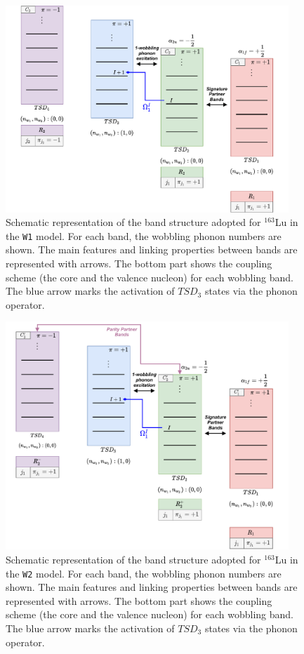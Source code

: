 \documentclass[myclassdoc,debug]{rjparticle}
\begin{document}
\begin{figure}
    \centering
    \includegraphics[width=0.95\textwidth]{figs/W1_Approach.pdf}
    \caption{Schematic representation of the band structure adopted for $^{163}$Lu in the \texttt{W1} model. For each band, the wobbling phonon numbers are shown. The main features and linking properties between bands are represented with arrows. The bottom part shows the coupling scheme (the core and the valence nucleon) for each wobbling band. The blue arrow marks the activation of $TSD_3$ states via the phonon operator.}
    \label{w1-model-worfklow}
\end{figure}
\begin{figure}
  \centering
    \includegraphics[width=0.95\textwidth]{figs/W2_Approach.pdf}
    \caption{Schematic representation of the band structure adopted for $^{163}$Lu in the \texttt{W2} model. For each band, the wobbling phonon numbers are shown. The main features and linking properties between bands are represented with arrows. The bottom part shows the coupling scheme (the core and the valence nucleon) for each wobbling band. The blue arrow marks the activation of $TSD_3$ states via the phonon operator.}
    \label{w2-model-worfklow}
\end{figure}
\end{document}
